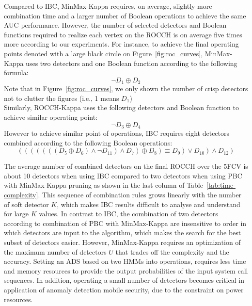 Compared to IBC, MinMax-Kappa requires, on average, slightly more combination time and a larger number of Boolean operations to achieve the same AUC performance.
However, the number of selected detectors and Boolean functions required to realize each vertex on the ROCCH is on average five times more according to our experiments.
For instance, to achieve the final operating points denoted with a  large black circle on Figure~\ref{fig:roc_curves}, MinMax-Kappa uses two detectors and one Boolean function according to the following formula:
\begin{equation*}
    \neg D_1 \oplus  D_2
\end{equation*}
Note that in Figure~\ref{fig:roc_curves}, we only shown the number of crisp detectors not to clutter the figures (i.e., 1 means $D_1$)
\\
Similarly, ROCCH-Kappa uses the following detectors and Boolean function to achieve similar operating point:
\begin{equation*}
    \neg D_3 \oplus  D_4
\end{equation*}
However to achieve similar point of operations, IBC requires eight detectors combined according to the following Boolean operations:
\begin{equation*}
    (((((((D_5 \oplus D_6) \land \neg D_{11})  \land D_7) \oplus D_8) \equiv D_9) \lor D_{10})  \land D_{12})
\end{equation*}

The average number of combined detectors on the final ROCCH over the 5FCV is about 10 detectors when using IBC compared to two detectors when using PBC with MinMax-Kappa pruning as shown in the last column of Table~\ref{tab:time-complexity}.
This sequence of combination rules grows linearly with the number of soft detector $K$, which makes IBC results difficult to analyse and understand for large $K$ values.
In contrast to IBC, the combination of two detectors according to combination of PBC with MinMax-Kappa are insensitive to order in which detectors are input to the algorithm, which makes the search for the best subset of detectors easier.
However, MinMax-Kappa requires an optimization of the maximum number of detectors $U$ that trades off the complexity and the accuracy.
Setting an ADS based on two HMMs into operations, requires less time and memory resources to provide the output probabilities of the input system call sequences.
In addition, operating a small number of detectors becomes critical in application of anomaly detection mobile security, due to the constraint on power resources.

